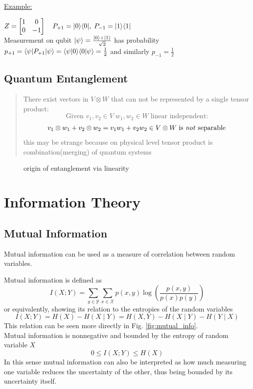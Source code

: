 			\quad\underline{Example:}\\
			\begin{center}
				$ Z = \begin{bmatrix} 1 & 0 \\ 0 & -1 \end{bmatrix} \quad P_{+1} = |0\rangle\langle 0| , \; P_{-1} = |1\rangle\langle 1|	 $\\
				Measurement on qubit $ |\psi \rangle = \frac{|0 \rangle + |1 \rangle}{\sqrt{2}} $ has probability $p_{+1} = \langle \psi|P_{+1}|\psi \rangle = \langle\psi|0\rangle\langle0|\psi\rangle = \frac{1}{2}$ and similarly $p_{-1} = \frac{1}{2}$
				\cite{NC10}
			\end{center}%

		\subsection{Quantum Entanglement}
		\begin{quotation}
		There exist vectors in $V\otimes W$ that can not be represented by a single tensor product:
		$$ \textrm{Given } v_1,v_2\in V \; w_1,w_2\in W \; \textrm{linear independent:}$$
		$$v_1\otimes w_1 + v_2\otimes w_2 = v_1w_1 + v_2w_2 \in V\otimes W \; \textrm{is \emph{not} separable}$$ 
		this may be strange because on physical level tensor product is combination(merging) of quantum systems
		\cite{Han13}
		\end{quotation}
		
		\begin{figure}[h]
			\centering
			
			\caption{origin of entanglement via linearity}
		\end{figure}
	
\section{Information Theory}
	
	\subsection{Mutual Information}
	Mutual information can be used as a measure of correlation between random variables. 
	
	Mutual information is defined as
	$$ I(X;Y) = \sum_{y\in\mathcal{Y}}\sum_{x\in\mathcal{X}} p(x,y) \log\left(\frac{p(x,y)}{p(x)p(y)}\right) $$
	or equivalently, showing its relation to the entropies of the random variables
	$$ I(X;Y) = H(X) - H(X\mid Y) = H(X,Y) - H(X\mid Y) - H(Y\mid X) $$
	This relation can be seen more directly in Fig. \ref{fig:mutual_info}.\\
	Mutual information is nonnegative and bounded by the entropy of random variable $X$
	$$ 0 \leq I(X;Y) \leq H(X) $$
	In this sense mutual information can also be interpreted as how much measuring one variable reduces the uncertainty of the other, thus being bounded by its uncertainty itself.
	
